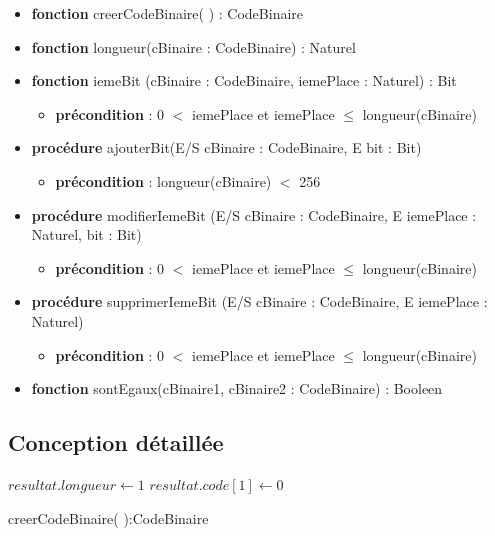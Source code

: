     \begin{itemize}[label=$\ $, leftmargin=1cm]
        \item \textbf{fonction} creerCodeBinaire( ) : CodeBinaire
        \item \textbf{fonction} longueur(cBinaire : CodeBinaire) : Naturel
        \item \textbf{fonction} iemeBit (cBinaire : CodeBinaire, iemePlace : Naturel) : Bit
        \begin{itemize}[label=$| $, leftmargin=1cm]
            \item \textbf{précondition} : 0 $<$ iemePlace et iemePlace $ \leqslant$ longueur(cBinaire)
        \end{itemize}
        \item \textbf{procédure} ajouterBit(E/S cBinaire : CodeBinaire, E bit : Bit)
        \begin{itemize}[label=$| $, leftmargin=1cm]
            \item \textbf{précondition} : longueur(cBinaire) $<$ 256
        \end{itemize}
        \item \textbf{procédure} modifierIemeBit (E/S cBinaire : CodeBinaire, E iemePlace : Naturel, bit : Bit)
        \begin{itemize}[label=$| $, leftmargin=1cm]
            \item \textbf{précondition} : 0 $<$ iemePlace et iemePlace $ \leqslant$ longueur(cBinaire)
        \end{itemize}
        \item \textbf{procédure} supprimerIemeBit (E/S cBinaire : CodeBinaire, E iemePlace : Naturel)
        \begin{itemize}[label=$| $, leftmargin=1cm]
            \item \textbf{précondition} : 0 $<$ iemePlace et iemePlace $ \leqslant$ longueur(cBinaire)
        \end{itemize}
        \item \textbf{fonction} sontEgaux(cBinaire1, cBinaire2 : CodeBinaire) : Booleen
    \end{itemize}

    \subsection*{Conception détaillée}
    
    \begin{function}[H]
    \SetAlgoLined
    \Deb
        {$resultat.longueur \gets 1$ 
        $resultat.code[1] \gets 0$ 
        }
    \caption{creerCodeBinaire( ):CodeBinaire}
    \end{function}

